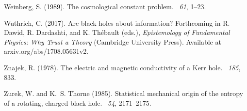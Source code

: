 \documentclass[12pt]{article}
\begin{document}
\begin{thebibliography}{}
Weinberg, S. (1989).
\newblock The cosmological constant problem.
~{\em 61}, 1--23.

Wuthrich, C. (2017).
\newblock Are black holes about information?
\newblock Forthcoming in R. Dawid, R. Dardashti, and K. Th{\'e}bault (eds.),
  \emph{Epistemology of Fundamental Physics: Why Trust a Theory} (Cambridge
  University Press). Available at arxiv.org/abs/1708.05631v2.

Znajek, R. (1978).
\newblock The electric and magnetic conductivity of a {K}err hole.
~{\em 185},
  833.

Zurek, W. and K.~S. Thorne (1985).
\newblock Statistical mechanical origin of the entropy of a rotating, charged
  black hole.
~{\em 54}, 2171--2175.

\end{thebibliography}
\end{document}
